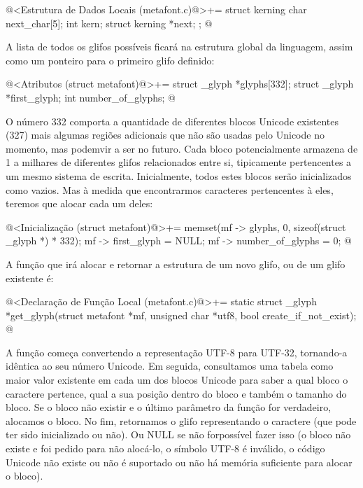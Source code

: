 {{{{{{\iniciocodigo
@<Estrutura de Dados Locais (metafont.c)@>+=
struct kerning{
  char next_char[5];
  int kern;
  struct kerning *next;
};
@
\fimcodigo

A lista de todos os glifos possíveis ficará na estrutura global da
linguagem, assim como um ponteiro para o primeiro glifo definido:

\iniciocodigo
@<Atributos (struct metafont)@>+=
struct _glyph *glyphs[332];
struct _glyph *first_glyph;
int number_of_glyphs;
@
\fimcodigo

O número 332 comporta a quantidade de diferentes blocos Unicode
existentes (327) mais algumas regiões adicionais que não são usadas
pelo Unicode no momento, mas podemvir a ser no futuro. Cada bloco
potencialmente armazena de 1 a milhares de diferentes glifos
relacionados entre si, tipicamente pertencentes a um mesmo sistema de
escrita. Inicialmente, todos estes blocos serão inicializados como
vazios. Mas à medida que encontrarmos caracteres pertencentes à eles,
teremos que alocar cada um deles:

\iniciocodigo
@<Inicialização (struct metafont)@>+=
memset(mf -> glyphs, 0, sizeof(struct _glyph *) * 332);
mf -> first_glyph = NULL;
mf -> number_of_glyphs = 0;
@
\fimcodigo

A função que irá alocar e retornar a estrutura de um novo glifo, ou de
um glifo existente é:

\iniciocodigo
@<Declaração de Função Local (metafont.c)@>+=
static struct _glyph *get_glyph(struct metafont *mf, unsigned char *utf8,
                                bool create_if_not_exist);
@
\fimcodigo

A função começa convertendo a representação UTF-8 para UTF-32,
tornando-a idêntica ao seu número Unicode. Em seguida, consultamos uma
tabela como maior valor existente em cada um dos blocos Unicode para
saber a qual bloco o caractere pertence, qual a sua posição dentro do
bloco e também o tamanho do bloco. Se o bloco não existir e o último
parâmetro da função for verdadeiro, alocamos o bloco. No fim,
retornamos o glifo representando o caractere (que pode ter sido
inicializado ou não). Ou NULL se não forpossível fazer isso (o bloco
não existe e foi pedido para não alocá-lo, o símbolo UTF-8 é inválido,
o código Unicode não existe ou não é suportado ou não há memória
suficiente para alocar o bloco).

}}}}}}
